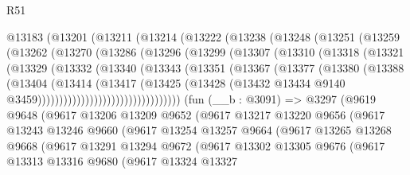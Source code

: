 \begin{lexlean}{R51}
\begin{coremodule}
    @13183
      (@13201
        (@13211
          (@13214
            (@13222
              (@13238
                (@13248
                  (@13251
                    (@13259
                      (@13262
                        (@13270
                          (@13286
                            (@13296
                              (@13299
                                (@13307
                                  (@13310
                                    (@13318
                                      (@13321
                                        (@13329
                                          (@13332
                                            (@13340
                                              (@13343
                                                (@13351
                                                  (@13367
                                                    (@13377
                                                      (@13380
                                                        (@13388
                                                          (@13404
                                                            (@13414
                                                              (@13417
                                                                (@13425
                                                                  (@13428
                                                                    (@13432
                                                                      @13434
                                                                      @9140
                                                                      @3459)))))))))))))))))))))))))))))))))
    (fun (__b : @3091) =>
    @3297
      (@9619
        @9648
        (@9617
          @13206
          @13209
          @9652
          (@9617
            @13217
            @13220
            @9656
            (@9617
              @13243
              @13246
              @9660
              (@9617
                @13254
                @13257
                @9664
                (@9617
                  @13265
                  @13268
                  @9668
                  (@9617
                    @13291
                    @13294
                    @9672
                    (@9617
                      @13302
                      @13305
                      @9676
                      (@9617
                        @13313
                        @13316
                        @9680
                        (@9617
                          @13324
                          @13327

\end{coremodule}
\end{lexlean}
